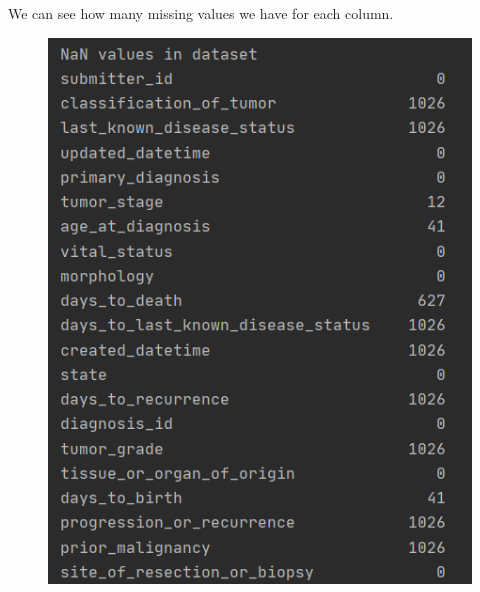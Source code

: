 \documentclass[onecolumn]{article}
\begin{document}
We can see how many missing values we have for each column.
\begin{figure}[h]
    \centering
    \begin{minipage}{0.4\textwidth}
        \centering
        \includegraphics[width=1.0\textwidth]{nan1.png} %
    \end{minipage}\hfill
    \begin{minipage}{0.4\textwidth}
        \centering

\end{minipage}
\end{figure}
\end{document}
